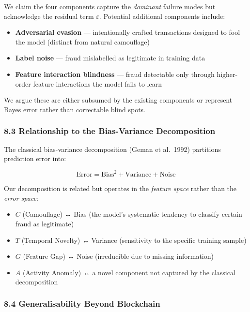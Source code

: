 \documentclass[
  11pt,
]{article}
\providecommand{\tightlist}{%
  \setlength{\itemsep}{0pt}\setlength{\parskip}{0pt}}
\begin{document}
We claim the four components capture the \emph{dominant} failure modes
but acknowledge the residual term \(\varepsilon\). Potential additional
components include:

\begin{itemize}
\tightlist
\item
  \textbf{Adversarial evasion} — intentionally crafted transactions
  designed to fool the model (distinct from natural camouflage)
\item
  \textbf{Label noise} — fraud mislabelled as legitimate in training
  data
\item
  \textbf{Feature interaction blindness} — fraud detectable only through
  higher-order feature interactions the model fails to learn
\end{itemize}

We argue these are either subsumed by the existing components or
represent Bayes error rather than correctable blind spots.

\subsubsection{8.3 Relationship to the Bias-Variance
Decomposition}\label{relationship-to-the-bias-variance-decomposition}

The classical bias-variance decomposition (Geman et al.~1992) partitions
prediction error into:

\[\text{Error} = \text{Bias}^2 + \text{Variance} + \text{Noise}\]

Our decomposition is related but operates in the \emph{feature space}
rather than the \emph{error space}:

\begin{itemize}
\tightlist
\item
  \(C\) (Camouflage) ↔ Bias (the model’s systematic tendency to classify
  certain fraud as legitimate)
\item
  \(T\) (Temporal Novelty) ↔ Variance (sensitivity to the specific
  training sample)
\item
  \(G\) (Feature Gap) ↔ Noise (irreducible due to missing information)
\item
  \(A\) (Activity Anomaly) ↔ a novel component not captured by the
  classical decomposition
\end{itemize}

\subsubsection{8.4 Generalisability Beyond
Blockchain}\label{generalisability-beyond-blockchain}
\end{document}
